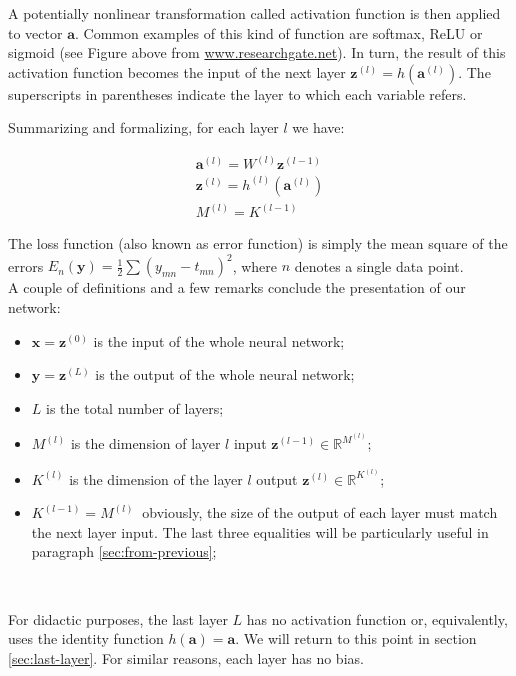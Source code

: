 \documentclass{article}
\begin{document}
A potentially nonlinear transformation called activation function is then applied to vector $\displaystyle \mathbf{a}$. Common examples of this kind of function are softmax, ReLU or sigmoid (see Figure above from \url{www.researchgate.net}). In turn, the result of this activation function becomes the input of the next layer $\displaystyle \mathbf{z}^{( l)} =h(\mathbf{a}^{( l)})$. The superscripts in parentheses indicate the layer to which each variable refers.

Summarizing and formalizing, for each layer $\displaystyle l$ we have:

\begin{gather*}
\mathbf{a}^{( l)} =W^{( l)}\mathbf{z}^{( l-1)}\\
\mathbf{z}^{( l)} =h^{( l)}\left(\mathbf{a}^{( l)}\right)\\
M^{( l)}=K^{( l-1)} \
\end{gather*}

The loss function (also known as error function) is simply the mean square of the errors $E_{n}(\mathbf{y}) =\frac{1}{2}\sum ( y_{mn} -t_{mn})^{2}$, where $n$ denotes a single data point.   \\

A couple of definitions and a few remarks conclude the presentation of our network:
\begin{itemize}
    \item $\displaystyle \mathbf{x} =\mathbf{z}^{( 0)}$   is the input of the whole neural network;
    \item $\displaystyle \mathbf{y} =\mathbf{z}^{( L)}$  is the output of the whole neural network;
    \item $\displaystyle L$ is the total number of layers;
    \item $\displaystyle M^{( l)}$ is the dimension of layer $l$ input $\displaystyle \mathbf{z}^{( l-1)} \in \mathbb{R}^{M^{( l)}}$;
    \item $\displaystyle K^{( l)}$ is the dimension of the layer $l$ output $\displaystyle \mathbf{z}^{(l)} \in \mathbb{R}^{K^{( l)}}$;
    \item $ K^{( l-1)}=M^{(l)} \ $ obviously, the size of the output of each layer must match the next layer input. The last three equalities will be particularly useful in paragraph \ref{sec:from-previous};
\end{itemize}
\

\begin{tcolorbox}[colback=gray!10, colframe=gray!50, title=Note]
For didactic purposes, the last layer $L$ has no activation function or, equivalently, uses the identity function $h(\boldsymbol{a})=\boldsymbol{a}$. We will return to this point in section \ref{sec:last-layer}.
For similar reasons, each layer has no bias.
\end{tcolorbox}
\end{document}

